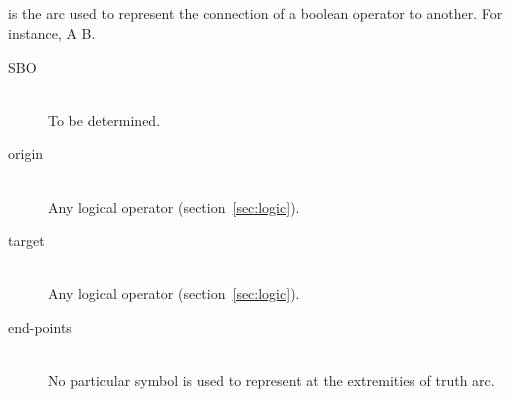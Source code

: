 \subsection{ }\label{sec:truth}

 is the arc used to represent the connection of a boolean operator to another. For instance, A   B.

\begin{description}
 \item[SBO]\mbox{}\\ To be determined.
 \item[origin]\mbox{}\\ Any logical operator (section~\ref{sec:logic}).
 \item[target]\mbox{}\\ Any logical operator (section~\ref{sec:logic}).
 \item[end-points]\mbox{}\\ No particular symbol is used to represent at the extremities of truth arc.
 \end{description}

\begin{center}
\end{center}
\normalcolor
